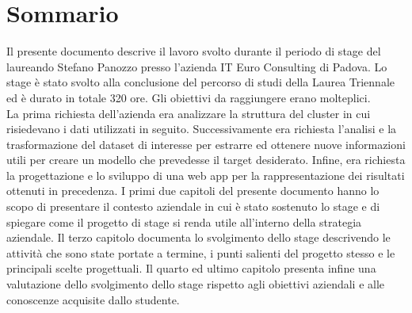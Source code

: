 
\cleardoublepage
{}
{}
\begingroup
\let\clearpage\relax
\let\cleardoublepage\relax
\let\cleardoublepage\relax

\chapter*{Sommario}

Il presente documento descrive il lavoro svolto durante il periodo di stage del laureando Stefano Panozzo presso l'azienda IT Euro Consulting di Padova. Lo stage è stato svolto alla conclusione del percorso di studi della Laurea Triennale ed è durato in totale 320 ore.
Gli obiettivi da raggiungere erano molteplici.\\
La prima richiesta dell'azienda era analizzare la struttura del \gls{cluster} in cui risiedevano i dati utilizzati in seguito. 
Successivamente era richiesta l'analisi e la trasformazione del dataset di interesse per estrarre ed ottenere nuove informazioni utili per creare un modello che prevedesse il target desiderato. 
Infine, era richiesta la progettazione e lo sviluppo di una \gls{web app} per la rappresentazione dei risultati ottenuti in precedenza.
I primi due capitoli del presente documento hanno lo scopo di presentare il contesto aziendale in cui è stato sostenuto lo stage e di spiegare come il progetto di stage si renda utile all’interno della strategia aziendale. Il terzo capitolo documenta lo svolgimento dello stage descrivendo le attività che sono state portate a termine, i punti salienti del progetto stesso e le principali scelte progettuali. Il quarto ed ultimo capitolo presenta infine una valutazione dello svolgimento dello stage rispetto agli obiettivi aziendali e alle conoscenze acquisite dallo studente.

%
%

\endgroup			

\vfill


